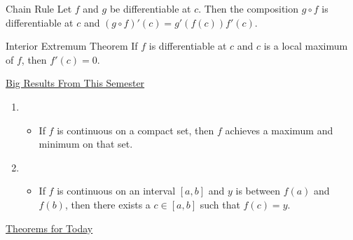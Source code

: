 \begin{ntheorem}
    {Chain Rule} Let \(f\) and \(g\) be differentiable at \(c\). Then the composition \(g \circ f\) is differentiable at \(c\) and \((g \circ f)'(c) = g'(f(c))f'(c)\).
\end{ntheorem}


\begin{ntheorem}
    {Interior Extremum Theorem} If \(f\) is differentiable at \(c\) and \(c\) is a local maximum of \(f\), then \(f'(c) = 0\).
\end{ntheorem}

\pfs
\begin{center}
    \underline{Big Results From This Semester}
\end{center}

\begin{enumerate}
    \item {}
    \begin{itemize}
        \item If \(f\) is continuous on a compact set, then \(f\) achieves a maximum and minimum on that set.
    \end{itemize}
    \item {}
    \begin{itemize}
        \item If \(f\) is continuous on an interval \([a, b]\) and \(y\) is between \(f(a)\) and \(f(b)\), then there exists a \(c \in [a, b]\) such that \(f(c) = y\).
    \end{itemize}

\end{enumerate}
\pfs
\begin{center}
    \underline{Theorems for Today}
\end{center}

